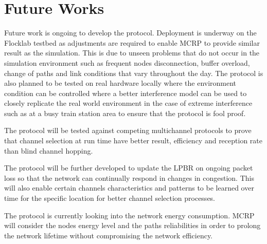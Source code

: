 \section{Future Works}
Future work is ongoing to develop the protocol. 
Deployment is underway on the Flocklab testbed as adjustments are required to enable MCRP to provide similar result as the simulation. This is due to unseen problems that do not occur in the simulation environment such as frequent nodes disconnection, buffer overload, change of paths and link conditions that vary throughout the day. The protocol is also planned to be tested on real hardware locally where the environment condition can be controlled where a better interference model can be used to closely replicate the real world environment in the case of extreme interference such as at a busy train station area to ensure that the protocol is fool proof.

The protocol will be tested against competing multichannel protocols to prove that channel selection at run time have better result, efficiency and reception rate than blind channel hopping.

The protocol will be further developed to update the LPBR on ongoing packet loss so that the network can continually respond in changes in congestion. This will also enable certain channels characteristics and patterns to be learned over time for the specific location for better channel selection processes. 

The protocol is currently looking into the network energy consumption. MCRP will consider the nodes energy level and the paths reliabilities in order to prolong the network lifetime without compromising the network efficiency.

